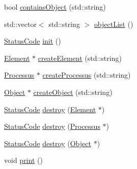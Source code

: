 \begin{DoxyCompactItemize}
\item 
bool \hyperlink{classDLL_af1aada8b1d5632bfac61639f997b9753}{contains\+Object} (std\+::string)
\item 
std\+::vector$<$ std\+::string $>$ \hyperlink{classDLL_a7d378e5aceb5b06e0fd7df6bc07f9ee5}{object\+List} ()
\item 
\hyperlink{classStatusCode}{Status\+Code} \hyperlink{classDLL_ad2a4ae95995c0fa312ae31169df12d72}{init} ()
\item 
\hyperlink{classElement}{Element} $\ast$ \hyperlink{classDLL_a20cd236b93830729cad8fcec092e5e18}{create\+Element} (std\+::string)
\item 
\hyperlink{classProcessus}{Processus} $\ast$ \hyperlink{classDLL_a9136bcd5e5ca7894bd337241803735c3}{create\+Processus} (std\+::string)
\item 
\hyperlink{classObject}{Object} $\ast$ \hyperlink{classDLL_aab0ac14c9ae23fe6cb9aadb2cbc87424}{create\+Object} (std\+::string)
\item 
\hyperlink{classStatusCode}{Status\+Code} \hyperlink{classDLL_abbe40e8f9065dfcfef3df9decb60087b}{destroy} (\hyperlink{classElement}{Element} $\ast$)
\item 
\hyperlink{classStatusCode}{Status\+Code} \hyperlink{classDLL_ac2ca6dfa120f123af42bff6f0b3fec5a}{destroy} (\hyperlink{classProcessus}{Processus} $\ast$)
\item 
\hyperlink{classStatusCode}{Status\+Code} \hyperlink{classDLL_a4334ca0b1639c39d905c3553f5b9d507}{destroy} (\hyperlink{classObject}{Object} $\ast$)
\item 
void \hyperlink{classDLL_ae45f8b4b291e9da806f4921dd7468cfc}{print} ()
\end{DoxyCompactItemize}
